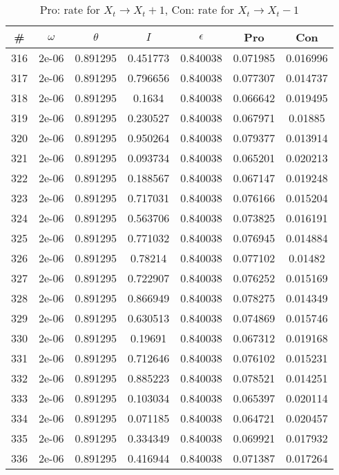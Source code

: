 \newpage
\begin{table}
\caption{Pro: rate for $X_t \rightarrow X_t + 1$, Con: rate for $X_t \rightarrow X_t - 1$}
\begin{tabular*}{\linewidth}{c|c|c|c|c|c|c}
\# & $\omega$ & $\theta$ & $I$ & $\epsilon$ & Pro & Con \\
\hline
316 & 2e-06 & 0.891295 & 0.451773 & 0.840038 & 0.071985 & 0.016996\\
317 & 2e-06 & 0.891295 & 0.796656 & 0.840038 & 0.077307 & 0.014737\\
318 & 2e-06 & 0.891295 & 0.1634 & 0.840038 & 0.066642 & 0.019495\\
319 & 2e-06 & 0.891295 & 0.230527 & 0.840038 & 0.067971 & 0.01885\\
320 & 2e-06 & 0.891295 & 0.950264 & 0.840038 & 0.079377 & 0.013914\\
321 & 2e-06 & 0.891295 & 0.093734 & 0.840038 & 0.065201 & 0.020213\\
322 & 2e-06 & 0.891295 & 0.188567 & 0.840038 & 0.067147 & 0.019248\\
323 & 2e-06 & 0.891295 & 0.717031 & 0.840038 & 0.076166 & 0.015204\\
324 & 2e-06 & 0.891295 & 0.563706 & 0.840038 & 0.073825 & 0.016191\\
325 & 2e-06 & 0.891295 & 0.771032 & 0.840038 & 0.076945 & 0.014884\\
326 & 2e-06 & 0.891295 & 0.78214 & 0.840038 & 0.077102 & 0.01482\\
327 & 2e-06 & 0.891295 & 0.722907 & 0.840038 & 0.076252 & 0.015169\\
328 & 2e-06 & 0.891295 & 0.866949 & 0.840038 & 0.078275 & 0.014349\\
329 & 2e-06 & 0.891295 & 0.630513 & 0.840038 & 0.074869 & 0.015746\\
330 & 2e-06 & 0.891295 & 0.19691 & 0.840038 & 0.067312 & 0.019168\\
331 & 2e-06 & 0.891295 & 0.712646 & 0.840038 & 0.076102 & 0.015231\\
332 & 2e-06 & 0.891295 & 0.885223 & 0.840038 & 0.078521 & 0.014251\\
333 & 2e-06 & 0.891295 & 0.103034 & 0.840038 & 0.065397 & 0.020114\\
334 & 2e-06 & 0.891295 & 0.071185 & 0.840038 & 0.064721 & 0.020457\\
335 & 2e-06 & 0.891295 & 0.334349 & 0.840038 & 0.069921 & 0.017932\\
336 & 2e-06 & 0.891295 & 0.416944 & 0.840038 & 0.071387 & 0.017264\\

\end{tabular*}
\end{table}
